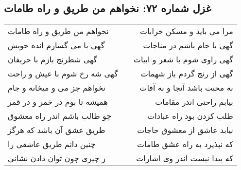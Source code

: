 \begin{center}
\section*{غزل شماره ۷۲: نخواهم من طریق و راه طامات}
\label{sec:072}
\begin{longtable}{l p{0.5cm} r}
نخواهم من طریق و راه طامات
&&
مرا می باید و مسکن خرابات
\\
گهی با می گسارم انده خویش
&&
گهی با جام باشم در مناجات
\\
گهی شطرنج بازم با حریفان
&&
گهی راوی شوم با شعر و ابیات
\\
گهی شه رخ شوم با عیش و راحت
&&
گهی از رنج گردم باز شهمات
\\
نخواهم جز می و میخانه و جام
&&
نه محنت باشد آنجا و نه آفات
\\
همیشه تا بوم در خمر و در قمر
&&
بیابم راحتی اندر مقامات
\\
چو طالب باشم اندر راه معشوق
&&
طلب کردن بود راه عبادات
\\
طریق عشق آن باشد که هرگز
&&
نیابد عاشق از معشوق حاجات
\\
چنین دانم طریق عاشقی را
&&
که نپذیرد به راه عشق طامات
\\
ز چیزی چون توان دادن نشانی
&&
که پیدا نیست اندر وی اشارات
\\
\end{longtable}
\end{center}
